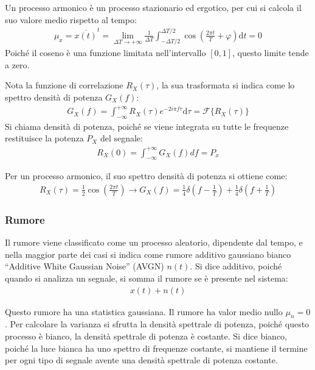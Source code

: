 \documentclass{article}
\newcommand{\df}{\mathrm{d}}
\numberwithin{equation}{subsection}
\begin{document}
Un processo armonico è un processo stazionario ed ergotico, per cui si calcola il suo valore medio rispetto al tempo:
\begin{gather*}
    \mu_x=\overline{x(t)}^t=\lim_{\Delta T\to+\infty}\displaystyle\frac{1}{\Delta T}\int_{-\Delta T/2}^{\Delta T/2}\cos\left(\frac{2\pi t}{T}+\varphi\right)\df t=0
\end{gather*}
Poiché il coseno è una funzione limitata nell'intervallo $[0,1]$, questo limite tende a zero. 


Nota la funzione di correlazione $R_X(\tau)$, la sua trasformata si indica come lo spettro densità di potenza $G_X(f)$:
\begin{gather*}
    G_X(f)=\displaystyle\int_{-\infty}^{+\infty}R_X(\tau)e^{-2i\pi f\tau}\df\tau=\mathscr{F}\{R_X(\tau)\}
\end{gather*}
Si chiama densità di potenza, poiché se viene integrata su tutte le frequenze restituisce la potenza $P_X$ del segnale:
\begin{gather*}
    R_X(0)=\displaystyle\int_{-\infty}^{+\infty}G_X(f)df=P_x
\end{gather*}

Per un processo armonico, il suo spettro densità di potenza si ottiene come:
\begin{gather*}
    R_X(\tau)=\displaystyle\frac{1}{2}\cos\left(\frac{2\pi t}{T}\right)\to G_X(f)=\displaystyle\frac{1}{4}\delta\left(f-\frac{1}{T}\right)+\frac{1}{4}\delta\left(f+\frac{1}{T}\right)
\end{gather*}

\subsubsection{Rumore}
Il rumore viene classificato come un processo aleatorio, dipendente dal tempo, e nella maggior parte dei casi si indica come rumore additivo gaussiano bianco 
``Additive White Gaussian Noise'' (AVGN) $n(t)$. 
Si dice additivo, poiché quando si analizza un segnale, si somma il rumore se è presente nel sistema:
\begin{gather*}
    x(t)+n(t)
\end{gather*} 

Questo rumore ha una statistica gaussiana. Il rumore ha valor medio nullo $\mu_n=0$. 
Per calcolare la varianza si sfrutta la densità spettrale di potenza, poiché questo processo è bianco, la densità spettrale di potenza è costante. 
Si dice bianco, poiché la luce bianca ha uno spettro di frequenze costante, si mantiene il termine per ogni tipo di segnale avente una densità spettrale di potenza 
costante. 
\end{document}
